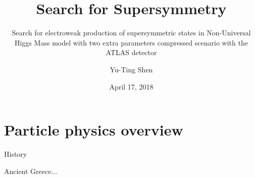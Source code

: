 \documentclass[10pt]{beamer}
\title[PhD Defense]{Search for Supersymmetry}
\subtitle{Search for electroweak production of supersymmetric states in Non-Universal Higgs Mass model with two extra parameters compressed scenario with the ATLAS detector}
\author[Yu-Ting]{Yu-Ting Shen}
\institute[OU]{Department of Physics and Astronomy\\The University of Oklahoma}
\date{April 17, 2018}
\begin{document}
\begin{frame}
    \titlepage
\end{frame}



\section{Particle physics overview}

{

\begin{frame}{History}
    \begin{center}
        \Huge{Ancient Greece...}
    \end{center}
\end{frame}

}
\end{document}
